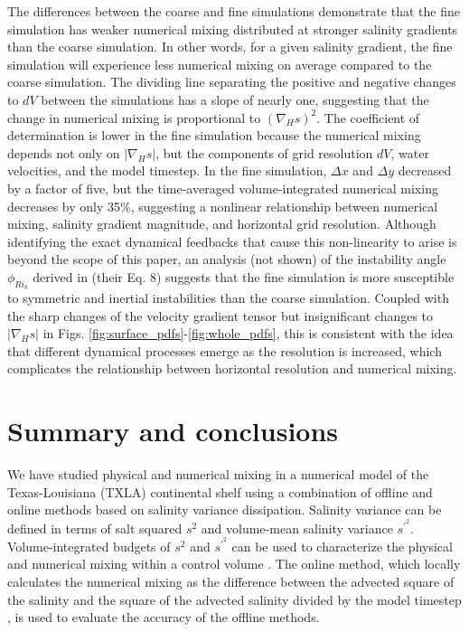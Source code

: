 \documentclass[draft]{agujournal2019}
\begin{document}
The differences between the coarse and fine simulations demonstrate that the fine simulation has weaker numerical mixing distributed at stronger salinity gradients than the coarse simulation. In other words, for a given salinity gradient, the fine simulation will experience less numerical mixing on average compared to the coarse simulation. The dividing line separating the positive and negative changes to $dV$ between the simulations has a slope of nearly one, suggesting that the change in numerical mixing is proportional to $(\nabla_H s)^2$. The coefficient of determination is lower in the fine simulation because the numerical mixing depends not only on $|\nabla_H s|$, but the components of grid resolution $dV$, water velocities, and the model timestep. In the fine simulation, $\Delta x$ and $\Delta y$ decreased by a factor of five, but the time-averaged volume-integrated numerical mixing decreases by only 35$\%$, suggesting a nonlinear relationship between numerical mixing, salinity gradient magnitude, and horizontal grid resolution. Although identifying the exact dynamical feedbacks that cause this non-linearity to arise is beyond the scope of this paper, an analysis (not shown) of the instability angle $\phi_{{Ri}_b}$ derived in  (their Eq. 8) suggests that the fine simulation is more susceptible to symmetric and inertial instabilities than the coarse simulation. Coupled with the sharp changes of the velocity gradient tensor but insignificant changes to $|\nabla_H s|$ in Figs. \ref{fig:surface_pdfs}-\ref{fig:whole_pdfs}, this is consistent with the idea that different dynamical processes emerge as the resolution is increased, which complicates the relationship between horizontal resolution and numerical mixing.

\section{Summary and conclusions} \label{sec:conclusions}

We have studied physical and numerical mixing in a numerical model of the Texas-Louisiana (TXLA) continental shelf using a combination of offline and online methods based on salinity variance dissipation. Salinity variance can be defined in terms of salt squared $s^2$ and volume-mean salinity variance $s^{\prime^2}$. Volume-integrated budgets of $s^2$ and $s^{\prime^2}$ can be used to characterize the physical and numerical mixing within a control volume \cite{Burchard_2019, Qu_2022_box}. The online method, which locally calculates the numerical mixing as the difference between the advected square of the salinity and the square of the advected salinity divided by the model timestep \cite{Burchard_2008}, is used to evaluate the accuracy of the offline methods.
\end{document}
